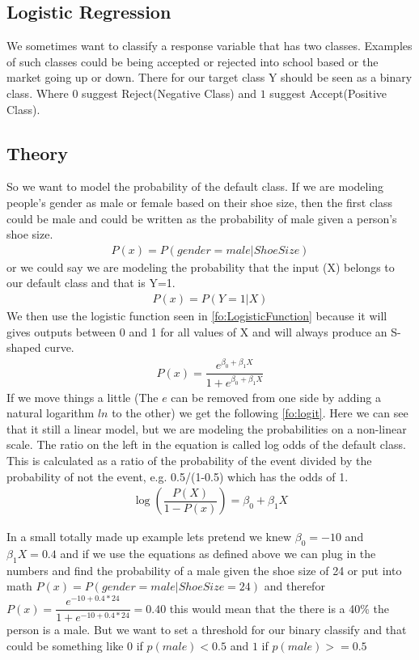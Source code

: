 \subsection{Logistic Regression}\label{sc:logisticRegression}
We sometimes want to classify a response variable that has two classes. Examples of such classes could be being accepted or rejected into school based or the market going up or down. There for our target class Y should be seen as a binary class. Where $0$ suggest Reject(Negative Class) and $1$ suggest Accept(Positive Class).
\subsection{Theory}
So we want to model the probability of the default class. If we are modeling people’s gender as male or female based on their shoe size, then the first class could be male and could be written as the probability of male given a person’s shoe size.
\begin{align}\label{fo:logit}
P(x) = P(gender=male|ShoeSize)
\end{align}
or we could say we are modeling the probability that the input (X) belongs to our default class and that is Y=1.
\begin{align}\label{fo:probability}
P(x) = P(Y=1|X)
\end{align}
We then use the logistic function seen in \ref{fo:LogisticFunction} because it will gives outputs between 0 and 1 for all values of X and will always produce an S-shaped curve.
\begin{align}\label{fo:LogisticFunction}
P(x) = \dfrac{ e^{\beta_0 + \beta_1 X}}{  1 + e^{\beta_0 + \beta_1 X}}
\end{align}
If we move things a little (The $e$ can be removed from one side by adding a natural logarithm $ln$ to the other) we get the following \ref{fo:logit}. Here we can see that it still a linear model, but we are modeling the probabilities on a non-linear scale.
The ratio on the left in the equation is called log odds of the default class. This is calculated as a ratio of the probability of the event divided by the probability of not the event, e.g. 0.5/(1-0.5) which has the odds of 1.
 \begin{align}\label{fo:logit}
\log( \dfrac{ P(X)}{1-P(x)} ) = \beta_0 + \beta_1 X
\end{align}

In a small totally made up example lets pretend we knew $\beta_0 = -10 $ and $ \beta_1 X = 0.4 $ and if we use the equations as defined above we can plug in the numbers and find the probability of a male given the shoe size of 24 or put into math $P(x) = P(gender=male|ShoeSize=24)$ and therefor $P(x) = \dfrac{ e^{-10 + 0.4*24}}{1 + e^{-10 + 0.4*24}} = 0.40$ this would mean that the there is a 40\% the person is a male. But we want to set a threshold for our binary classify and that could be something like $0$ if $p(male) < 0.5$ and $1$ if $ p(male) >= 0.5$

